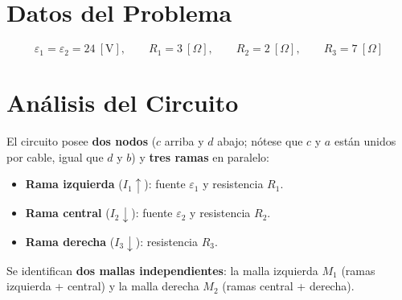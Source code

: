 \documentclass[12pt,letterpaper]{article}
\begin{document}
\begin{center}
\end{center}

\section*{Datos del Problema}

\[
    \varepsilon_1 = \varepsilon_2 = 24\ [\text{V}],\qquad
    R_1 = 3\ [\Omega],\qquad
    R_2 = 2\ [\Omega],\qquad
    R_3 = 7\ [\Omega]
\]

\section*{An\'alisis del Circuito}

El circuito posee \textbf{dos nodos} ($c$ arriba y $d$ abajo; n\'otese que $c$ y $a$ est\'an
unidos por cable, igual que $d$ y $b$) y \textbf{tres ramas} en paralelo:

\begin{itemize}
    \item \textbf{Rama izquierda} ($I_1 \uparrow$): fuente \textcolor{colE1}{$\varepsilon_1$}
          y resistencia \textcolor{colR1}{$R_1$}.
    \item \textbf{Rama central} ($I_2 \downarrow$): fuente \textcolor{colE2}{$\varepsilon_2$}
          y resistencia \textcolor{colR2}{$R_2$}.
    \item \textbf{Rama derecha} ($I_3 \downarrow$): resistencia \textcolor{colR3}{$R_3$}.
\end{itemize}

Se identifican \textbf{dos mallas independientes}: la malla izquierda $M_1$ (ramas izquierda +
central) y la malla derecha $M_2$ (ramas central + derecha).
\end{document}
